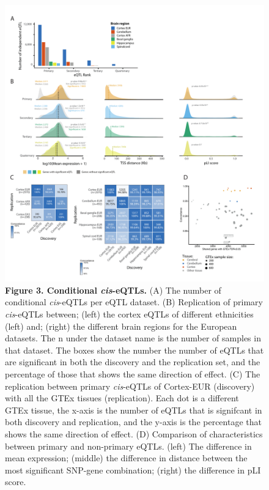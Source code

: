 \begin{figure}[H]
	\includegraphics[width=\textwidth]{chapters/chapter5-brain-eqtls/img/2020-12-02-fig3-ciseqtls-v12.pdf}
	\caption{\textbf{Figure 3. Conditional \emph{cis}-eQTLs.} (A) The number of conditional \emph{cis}-eQTLs per eQTL dataset. (B) Replication of primary \emph{cis}-eQTLs between; (left) the cortex eQTLs of different ethnicities (left) and; (right) the different brain regions for the European datasets. The n under the dataset name is the number of samples in that dataset. The boxes show the number the number of eQTLs that are significant in both the discovery and the replication set, and the percentage of those that shows the same direction of effect. (C) The replication between primary \emph{cis}-eQTLs of Cortex-EUR (discovery) with all the GTEx tissues (replication). Each dot is a different GTEx tissue, the x-axis is the number of eQTLs that is signifcant in both discovery and replication, and the y-axis is the percentage that shows the same direction of effect. (D) Comparison of characteristics between primary and non-primary eQTLs. (left) The difference in mean expression; (middle) the difference in distance between the most significant SNP-gene combination; (right) the difference in pLI score.}
\end{figure}

